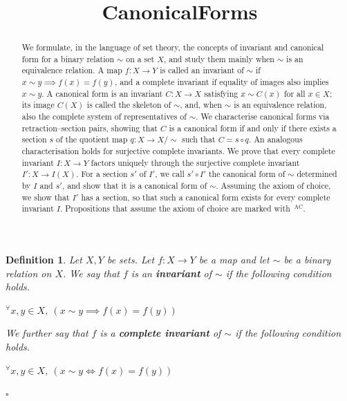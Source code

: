 \documentclass{article}
\title{CanonicalForms}
\date{}
\author{}
\theoremstyle{noperiod}
\newtheorem{definition}{Definition}
\begin{document}
\maketitle

\begin{abstract}
We formulate, in the language of set theory, the concepts of invariant and
canonical form for a binary relation $\sim$ on a set $X$, and study them
mainly when $\sim$ is an equivalence relation.
A map $f \colon X \to Y$ is called an invariant of $\sim$ if $x \sim y
\implies f(x) = f(y)$, and a complete invariant if equality of images
also implies $x \sim y$.
A canonical form is an invariant $C \colon X \to X$ satisfying $x \sim
C(x)$ for all $x \in X$; its image $C(X)$ is called the skeleton of $\sim$,
and, when $\sim$ is an equivalence relation, also the complete system of
representatives of $\sim$.
We characterise canonical forms via retraction--section pairs, showing that $C$
is a canonical form if and only if there exists a section $s$ of the quotient
map $q \colon X \to X/\sim$ such that $C = s \circ q$.
An analogous characterisation holds for surjective complete invariants.
We prove that every complete invariant $I \colon X \to Y$ factors uniquely
through the surjective complete invariant $I' \colon X \to I(X)$. For a
section $s'$ of $I'$, we call $s' \circ I'$ the canonical form of $\sim$
determined by $I$ and $s'$, and show that it is a canonical form of $\sim$.
Assuming the axiom of choice, we show that $I'$ has a section, so that such a
canonical form exists for every complete invariant $I$.
Propositions that assume the axiom of choice are marked
with~$^{\textrm{AC}}$.
\end{abstract}

\begin{definition}
Let $X, Y$ be sets. Let $f \colon X \to Y$ be a map and let $\sim$ be a
binary relation on $X$. We say that $f$ is an \textbf{invariant} of $\sim$
if the following condition holds.
\begin{center}
  ${^{\forall}x,y} \in X,\ (x \sim y \implies f(x) = f(y))$
\end{center}
We further say that $f$ is a \textbf{complete invariant} of $\sim$ if the
following condition holds.
\begin{center}
  ${^{\forall}x,y} \in X,\ (x \sim y \iff f(x) = f(y))$
\end{center}
\hfill $\square$
\end{definition}
\end{document}
